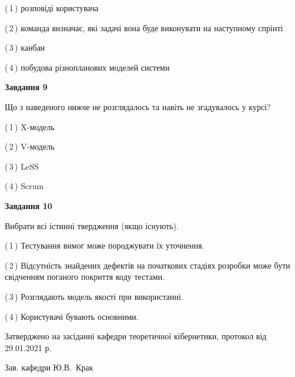 \documentclass[10pt, ukrainian]{article}
\begin{document}
{\begin {large}
(\,1\,) розповіді користувача%



(\,2\,) команда визначає, які задачі вона буде виконувати на наступному спрінті%



(\,3\,) канбан%



(\,4\,) побудова різнопланових моделей системи%


{\begin {center}\textbf{Завдання 9}\end {center}}\par
Що з наведеного нижче не розглядалось та навіть не згадувалось у курсі?\par
\vspace{2mm}



(\,1\,) X-модель%



(\,2\,) V-модель%



(\,3\,) LeSS%



(\,4\,) Scrum%


{\begin {center}\textbf{Завдання 10}\end {center}}\par
Вибрати всі істинні твердження (якщо існують).\par
\vspace{2mm}



(\,1\,) Тестування вимог може породжувати їх уточнення.%



(\,2\,) Відсутність знайдених дефектів на початкових стадіях розробки може бути свідченням поганого покриття коду тестами.%



(\,3\,) Розглядають модель якості при використанні.%



(\,4\,) Користувачі бувають основними.%



\end {large}}
{\vspace{5mm}\smallskip \begin {small} Затверджено на засіданні кафедри теоретичної кібернетики, протокол  від   29.01.2021 р.\par\smallskip\smallskip
{\parbox {6.5 cm}{Зав. кафедри \dotfill Ю.В.~Крак}} \end{small}}
\newpage
\end{document}
